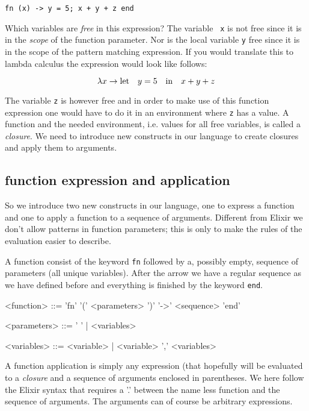 \documentclass[a4paper,11pt]{article}
\begin{document}
\begin{verbatim}
fn (x) -> y = 5; x + y + z end
\end{verbatim}

Which variables are {\em free} in this expression? The variable {\tt
  x} is not free since it is in the {\em scope} of the function
parameter. Nor is the local variable {\tt y} free since it is in the
scope of the pattern matching expression. If you would
translate this to lambda calculus the expression would look like
follows:

$$ \lambda x \rightarrow {\rm let} \quad y = 5 \quad {\rm in} \quad x + y + z$$

The variable {\tt z} is however free and in order to make use of this
function expression one would have to do it in an environment where
{\tt z} has a value. A function and the needed environment,
i.e. values for all free variables, is called a {\em closure}. We need
to introduce new constructs in our language to create closures and
apply them to arguments.


\subsection{function expression and application}

So we introduce two new constructs in our language, one to express a
function and one to apply a function to a sequence of
arguments. Different from Elixir we don't allow patterns in function
parameters; this is only to make the rules of the evaluation easier to
describe.

A function consist of the keyword {\tt fn} followed by a, possibly
empty, sequence of parameters (all unique variables). After the arrow
we have a regular sequence as we have defined before and everything is
finished by the keyword {\tt end}.

\begin{grammar}
<function> ::= 'fn' '(' <parameters> ')' '-\textgreater' <sequence> 'end'

<parameters> ::= ' ' | <variables> 

<variables> ::= <variable> |  <variable> ',' <variables>
\end{grammar}

A function application is simply any expression (that hopefully will
be evaluated to a {\em closure} and a sequence of arguments enclosed
in parentheses. We here follow the Elixir syntax that requires a
'.' between the name less function and the sequence of arguments.
The arguments can of course be arbitrary expressions.
\end{document}
